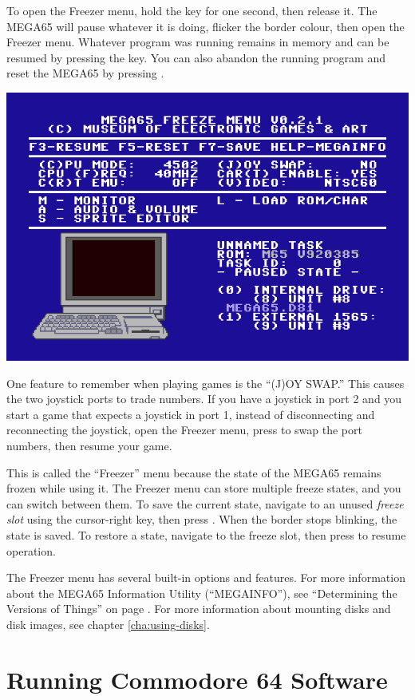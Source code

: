 To open the Freezer menu, hold the  key for one second, then release it. The MEGA65 will pause whatever it is doing, flicker the border colour, then open the Freezer menu. Whatever program was running remains in memory and can be resumed by pressing the  key. You can also abandon the running program and reset the MEGA65 by pressing .

\begin{center}
  \includegraphics[width=0.7\linewidth]{images/freezer.png}
\end{center}

One feature to remember when playing games is the ``(J)OY SWAP.'' This causes the two joystick ports to trade numbers. If you have a joystick in port 2 and you start a game that expects a joystick in port 1, instead of disconnecting and reconnecting the joystick, open the Freezer menu, press  to swap the port numbers, then resume your game.

This is called the ``Freezer'' menu because the state of the MEGA65 remains frozen while using it. The Freezer menu can store multiple freeze states, and you can switch between them. To save the current state, navigate to an unused {\it freeze slot} using the cursor-right key, then press . When the border stops blinking, the state is saved. To restore a state, navigate to the freeze slot, then press  to resume operation.

The Freezer menu has several built-in options and features. For more information about the MEGA65 Information Utility (``MEGAINFO''), see ``Determining the Versions of Things'' on page \pageref{sec:versions}. For more information about mounting disks and disk images, see chapter \vref{cha:using-disks}.


\section{Running Commodore 64 Software}

